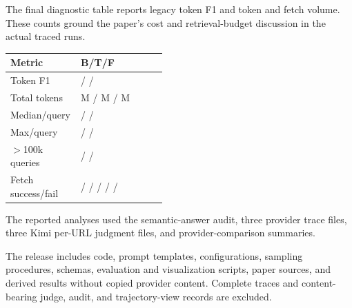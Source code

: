The final diagnostic table reports legacy token F1 and token and fetch volume. These counts ground the paper's cost and retrieval-budget discussion in the actual traced runs.

\begin{center}
\footnotesize
\setlength{\tabcolsep}{2pt}
\begin{tabularx}{\linewidth}{@{}L{0.45\linewidth}Y@{}}
\toprule
\textbf{Metric} & \textbf{B/T/F} \\
\midrule
Token F1 & \BraveFone{} / \TavilyFone{} / \FirecrawlFone{} \\
Total tokens & \BraveTokensM{}M / \TavilyTokensM{}M / \FirecrawlTokensM{}M \\
Median/query & \BraveMedianTokens{} / \TavilyMedianTokens{} / \FirecrawlMedianTokens{} \\
Max/query & \BraveMaxTokens{} / \TavilyMaxTokens{} / \FirecrawlMaxTokens{} \\
$>$100k queries & \BraveOverHundredK{} / \TavilyOverHundredK{} / \FirecrawlOverHundredK{} \\
Fetch success/fail & \BraveFetchSuccess{}/\BraveFetchFailed{} / \TavilyFetchSuccess{}/\TavilyFetchFailed{} / \FirecrawlFetchSuccess{}/\FirecrawlFetchFailed{} \\
\bottomrule
\end{tabularx}
\label{tab:app-token}
\end{center}

\begin{description}[leftmargin=0pt,itemsep=0.12em,topsep=0.1em]
\item[Analysis inputs.] The reported analyses used the semantic-answer audit, three provider trace files, three Kimi per-URL judgment files, and provider-comparison summaries.
\item[Released artifacts.] The release includes code, prompt templates, configurations, sampling procedures, schemas, evaluation and visualization scripts, paper sources, and derived results without copied provider content. Complete traces and content-bearing judge, audit, and trajectory-view records are excluded.
\end{description}
